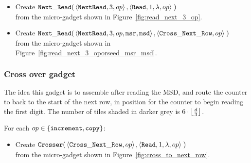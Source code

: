 \begin{itemize}
    \item Create
    $\begin{aligned}[t]
        \readnext(& \left\langle {\tt NextRead}, 3,          \inc \right\rangle,
                    \left\langle {\tt Read},     1, \lambda, \inc \right\rangle \;)
    \end{aligned}$\\from the micro-gadget shown in Figure~\ref{fig:read_next_3_op}.

    \item Create
    $\begin{aligned}[t]
        \readnext(& \left\langle {\tt NextRead}, 3,      \inc, {\tt msr}, {\tt msd} \right\rangle,
                    \left\langle {\tt Cross\_Next\_Row}, \inc \right\rangle \;)
    \end{aligned}$\\from the micro-gadget shown in Figure~\ref{fig:read_next_3_oporseed_msr_msd}.


\end{itemize}

\subsubsection{Cross over gadget}

The idea this gadget is to assemble after reading the MSD, and route the
counter to back to the start of the next row, in position for the counter to
begin reading the first digit. The number of tiles shaded in darker grey is
$6 \cdot \floor*{\frac{d}{3}}$.

\vspace{.5cm}
For each $\inc\in \{ {\tt increment}, {\tt copy} \}$:

\begin{itemize}
    \item Create
    $\begin{aligned}[t]
        {\tt Crosser}(&\left\langle {\tt Cross\_Next\_Row}, \inc \right\rangle,
                       \left\langle {\tt Read}, 1, \lambda, \inc \right\rangle \;)
    \end{aligned}$\\from the micro-gadget shown in Figure~\ref{fig:cross_to_next_row}.
\end{itemize}



